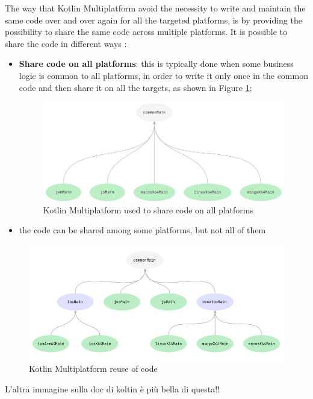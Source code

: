 The way that Kotlin Multiplatform avoid the necessity to write and maintain the same code over and over again for all the targeted platforms, is by providing the possibility to share the same code across multiple platforms.\newline
It is possible to share the code in different ways \cite{kotlin_multiplatform_share_code}:
\begin{itemize}
    \item \textbf{Share code on all platforms}: this is typically done when some business logic is common to all platforms, in order to write it only once in the common code and then share it on all the targets, as shown in Figure \ref{fig:km_share_code_on_all_platforms};
    \begin{figure}[!ht]
        \centering
        \includegraphics[scale=0.86]{document/chapters/4-collektive/images/km_share_code_on_all_platforms.png}
        \caption{Kotlin Multiplatform used to share code on all platforms \cite{kotlin_multiplatform_share_code}}
        \label{fig:km_share_code_on_all_platforms}
    \end{figure}
    \item the code can be shared among some platforms, but not all of them
\end{itemize}

\begin{figure}[!ht]
    \centering
    \includegraphics[scale=0.97]{document/chapters/4-collektive/images/kotlin_multiplatform_reuse_code.png}
    \caption{Kotlin Multiplatform reuse of code \cite{kotlin_multiplatform_overview}}
    \label{fig:km_reuse_code}
\end{figure}
L'altra immagine sulla doc di koltin è più bella di questa!!


